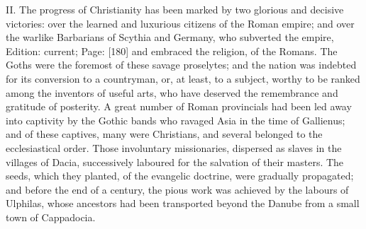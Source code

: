 II. The progress of Christianity has been marked by two glorious and decisive victories: over the learned and luxurious citizens of the Roman empire; and over the warlike Barbarians of Scythia and Germany, who subverted the empire, Edition: current; Page: [180] and embraced the religion, of the Romans. The Goths were the foremost of these savage proselytes; and the nation was indebted for its conversion to a countryman, or, at least, to a subject, worthy to be ranked among the inventors of useful arts, who have deserved the remembrance and gratitude of posterity. A great number of Roman provincials had been led away into captivity by the Gothic bands who ravaged Asia in the time of Gallienus; and of these captives, many were Christians, and several belonged to the ecclesiastical order. Those involuntary missionaries, dispersed as slaves in the villages of Dacia, successively laboured for the salvation of their masters. The seeds, which they planted, of the evangelic doctrine, were gradually propagated; and before the end of a century, the pious work was achieved by the labours of Ulphilas, whose ancestors had been transported beyond the Danube from a small town of Cappadocia.

